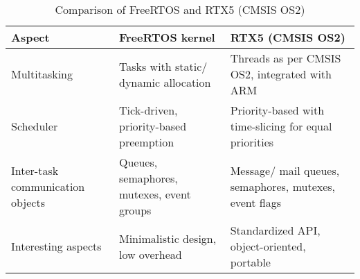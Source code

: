 \begin{table}[htbp]
    \centering
    \begin{tabular}{p{3.6cm} p{6cm} p{6cm}}
        \toprule
        \textbf{Aspect}
         &
        \textbf{FreeRTOS kernel}
         &
        \textbf{RTX5 (CMSIS OS2)}
        \\ \midrule
        Multitasking
         &
        Tasks with static/ dynamic allocation
         &
        Threads as per CMSIS OS2, integrated with ARM
        \\ \midrule
        Scheduler
         &
        Tick-driven, priority-based preemption
         &
        Priority-based with time-slicing for equal priorities
        \\ \midrule
        Inter-task communication objects
         &
        Queues, semaphores, mutexes, event groups
         &
        Message/ mail queues, semaphores, mutexes, event flags
        \\ \midrule
        Interesting aspects
         &
        Minimalistic design, low overhead
         &
        Standardized API, object-oriented, portable
        \\ \bottomrule
    \end{tabular}
    \caption{
        Comparison of FreeRTOS and RTX5 (CMSIS OS2)
    }\label{tab:comparison}
\end{table}

